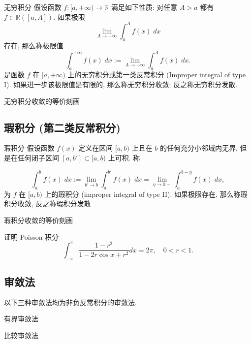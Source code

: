 \documentclass[cn,toc=twocol]{elegantbook}
\newcommand{\R}{\mathbb{R}}
\begin{document}
\begin{definition}{无穷积分}
	假设函数 $f : [a,+\infty) \to \R$ 满足如下性质: 对任意 $A > a$ 都有 $f \in \R([a,A])$. 如果极限
	\[
		\lim_{A\to+\infty}\int_a^A f(x)\;dx
	\]
	存在, 那么称极限值
	\[
		\int_a^{+\infty}f(x)\;dx := \lim_{A\to+\infty}\int_a^A f(x)\;dx.
	\]
	是函数 $f$ 在 $[a,+\infty)$ 上的无穷积分或第一类反常积分 (Improper integral of type I). 如果进一步该极限值是有限的, 那么称无穷积分收敛; 反之称无穷积分发散.
\end{definition}

\begin{theorem}{无穷积分收敛的等价刻画}
	
\end{theorem}


\subsection{瑕积分 (第二类反常积分)}

\begin{definition}{瑕积分}
	假设函数 $f(x)$ 定义在区间 $[a,b)$ 上且在 $b$ 的任何充分小邻域内无界, 但是在任何闭子区间 $[a,b'] \subset [a,b)$ 上可积. 称

	\[
		\int_a^b f(x)\;dx := \lim_{b' \to b}\int_a^{b'} f(x)\;dx = \lim_{\eta \to 0+}\int_a^{b - \eta}f(x)\;dx,
	\]  
为 $f$ 在 $[a, b)$ 上的瑕积分 (improper integral of type II). 如果极限存在, 那么称瑕积分收敛, 反之称瑕积分发散
\end{definition}

\begin{theorem}{瑕积分收敛的等价刻画}
	
\end{theorem}


\begin{example}
	证明 Poisson 积分
	\[
		\int_{-\pi}^{\pi} \frac{1 - r^2}{1 - 2 r \cos x + r^2} dx = 2\pi, \quad 0 < r < 1.
	\]	
\end{example}


\subsection{审敛法}

以下三种审敛法均为非负反常积分的审敛法.

\begin{theorem}{有界审敛法}
	
\end{theorem}

\begin{theorem}{比较审敛法}
	
\end{theorem}
\end{document}
